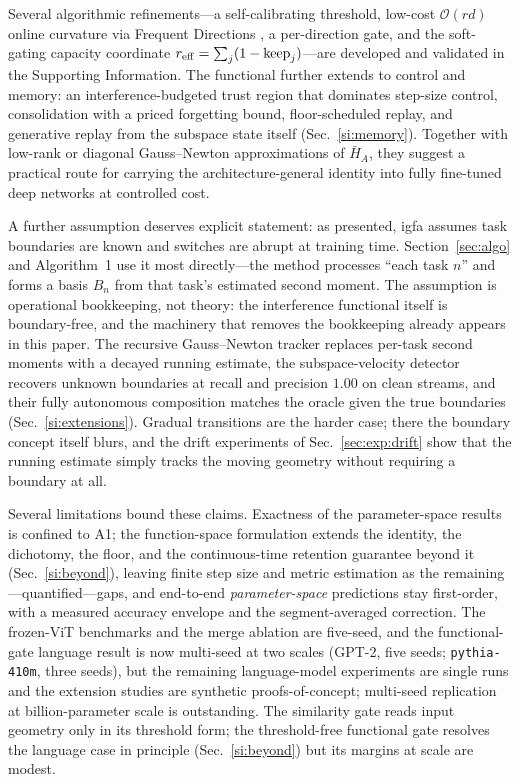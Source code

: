 \documentclass[10pt,a4paper]{article}
\theoremstyle{plain}
\theoremstyle{definition}
\newcommand{\IGFA}{igfa}
\begin{document}
Several algorithmic refinements---a self-calibrating threshold, low-cost $\mathcal{O}(rd)$
online curvature via Frequent Directions
\cite{liberty2013}, a per-direction gate, and the soft-gating capacity coordinate
$r_{\rm eff}=\sum_j(1-\mathrm{keep}_j)$---are developed and validated in the Supporting
Information. The functional further extends to control and memory: an interference-budgeted
trust region that dominates step-size control, consolidation with a priced forgetting bound,
floor-scheduled replay, and generative replay from the subspace state itself
(Sec.~\ref{si:memory}). Together with low-rank or diagonal Gauss--Newton approximations of
$\bar H_A$, they suggest a practical route for carrying the architecture-general identity
into fully fine-tuned deep networks at controlled cost.

A further assumption deserves explicit statement: as presented, \IGFA{} assumes task
boundaries are known and switches are abrupt at training time. Section~\ref{sec:algo} and
Algorithm~1 use it most directly---the method processes ``each task $n$'' and forms a basis
$B_n$ from that task's estimated second moment. The assumption is operational bookkeeping,
not theory: the interference functional itself is boundary-free, and the machinery that
removes the bookkeeping already appears in this paper. The recursive Gauss--Newton tracker
replaces per-task second moments with a decayed running estimate, the subspace-velocity
detector recovers unknown boundaries at recall and precision $1.00$ on clean streams, and
their fully autonomous composition matches the oracle given the true boundaries
(Sec.~\ref{si:extensions}). Gradual transitions are the harder case;
there the boundary concept itself blurs, and the drift experiments of
Sec.~\ref{sec:exp:drift} show that the running estimate simply tracks the moving geometry
without requiring a boundary at all.

Several limitations bound these claims. Exactness of the parameter-space results is
confined to A1; the function-space formulation extends the identity, the dichotomy, the
floor, and the continuous-time retention guarantee beyond it (Sec.~\ref{si:beyond}),
leaving finite step size and metric estimation as the remaining---quantified---gaps, and
end-to-end \emph{parameter-space} predictions stay first-order, with a measured accuracy
envelope and the segment-averaged correction. The
frozen-ViT benchmarks and the merge ablation are five-seed, and the functional-gate
language result is now multi-seed at two scales (GPT-2, five seeds;
\texttt{pythia-410m}, three seeds), but the remaining language-model experiments are
single runs and the extension studies are synthetic proofs-of-concept; multi-seed
replication at billion-parameter scale is outstanding. The
similarity gate reads input geometry only in its threshold form; the threshold-free
functional gate resolves the language case in principle (Sec.~\ref{si:beyond}) but its
margins at scale are modest.
\end{document}
